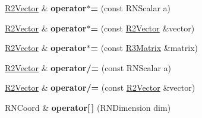 \begin{DoxyCompactItemize}
\item 
\hyperlink{class_r2_vector}{R2\+Vector} \& {\bfseries operator$\ast$=} (const R\+N\+Scalar a)\hypertarget{class_r2_vector_ae44e661d65faa3517c06967f4e41c7b3}{}\label{class_r2_vector_ae44e661d65faa3517c06967f4e41c7b3}

\item 
\hyperlink{class_r2_vector}{R2\+Vector} \& {\bfseries operator$\ast$=} (const \hyperlink{class_r2_vector}{R2\+Vector} \&vector)\hypertarget{class_r2_vector_af9c5325fe980cfc24b64e3a4ce15fb01}{}\label{class_r2_vector_af9c5325fe980cfc24b64e3a4ce15fb01}

\item 
\hyperlink{class_r2_vector}{R2\+Vector} \& {\bfseries operator$\ast$=} (const \hyperlink{class_r3_matrix}{R3\+Matrix} \&matrix)\hypertarget{class_r2_vector_af75f22818f4531d863ceb4887291fb96}{}\label{class_r2_vector_af75f22818f4531d863ceb4887291fb96}

\item 
\hyperlink{class_r2_vector}{R2\+Vector} \& {\bfseries operator/=} (const R\+N\+Scalar a)\hypertarget{class_r2_vector_a7ea909f2879fd0a489359e2d36a00a34}{}\label{class_r2_vector_a7ea909f2879fd0a489359e2d36a00a34}

\item 
\hyperlink{class_r2_vector}{R2\+Vector} \& {\bfseries operator/=} (const \hyperlink{class_r2_vector}{R2\+Vector} \&vector)\hypertarget{class_r2_vector_a9694d85cccdb3f1500101adc18b70051}{}\label{class_r2_vector_a9694d85cccdb3f1500101adc18b70051}

\item 
R\+N\+Coord \& {\bfseries operator\mbox{[}$\,$\mbox{]}} (R\+N\+Dimension dim)\hypertarget{class_r2_vector_a32c7c22c3286de4e84f358316cf2e7bb}{}\label{class_r2_vector_a32c7c22c3286de4e84f358316cf2e7bb}

\end{DoxyCompactItemize}

